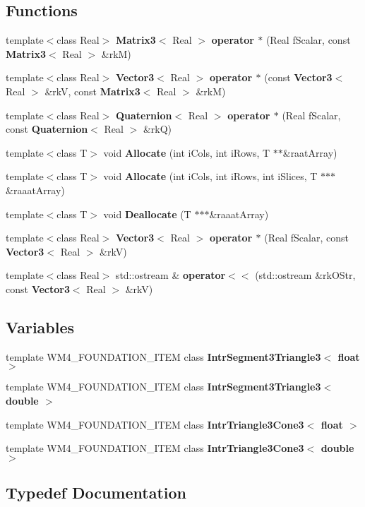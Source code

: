 \subsection*{Functions}
\begin{CompactItemize}
\item 
template$<$class Real$>$ {\bf Matrix3}$<$ Real $>$ {\bf operator $\ast$} (Real f\-Scalar, const {\bf Matrix3}$<$ Real $>$ \&rk\-M)
\item 
template$<$class Real$>$ {\bf Vector3}$<$ Real $>$ {\bf operator $\ast$} (const {\bf Vector3}$<$ Real $>$ \&rk\-V, const {\bf Matrix3}$<$ Real $>$ \&rk\-M)
\item 
template$<$class Real$>$ {\bf Quaternion}$<$ Real $>$ {\bf operator $\ast$} (Real f\-Scalar, const {\bf Quaternion}$<$ Real $>$ \&rk\-Q)
\item 
template$<$class T$>$ void {\bf Allocate} (int i\-Cols, int i\-Rows, T $\ast$$\ast$\&raat\-Array)
\item 
template$<$class T$>$ void {\bf Allocate} (int i\-Cols, int i\-Rows, int i\-Slices, T $\ast$$\ast$$\ast$\&raaat\-Array)
\item 
template$<$class T$>$ void {\bf Deallocate} (T $\ast$$\ast$$\ast$\&raaat\-Array)
\item 
template$<$class Real$>$ {\bf Vector3}$<$ Real $>$ {\bf operator $\ast$} (Real f\-Scalar, const {\bf Vector3}$<$ Real $>$ \&rk\-V)
\item 
template$<$class Real$>$ std::ostream \& {\bf operator$<$$<$} (std::ostream \&rk\-OStr, const {\bf Vector3}$<$ Real $>$ \&rk\-V)
\end{CompactItemize}
\subsection*{Variables}
\begin{CompactItemize}
\item 
template WM4\_\-FOUNDATION\_\-ITEM class {\bf Intr\-Segment3Triangle3$<$ float $>$}
\item 
template WM4\_\-FOUNDATION\_\-ITEM class {\bf Intr\-Segment3Triangle3$<$ double $>$}
\item 
template WM4\_\-FOUNDATION\_\-ITEM class {\bf Intr\-Triangle3Cone3$<$ float $>$}
\item 
template WM4\_\-FOUNDATION\_\-ITEM class {\bf Intr\-Triangle3Cone3$<$ double $>$}
\end{CompactItemize}


\subsection{Typedef Documentation}
